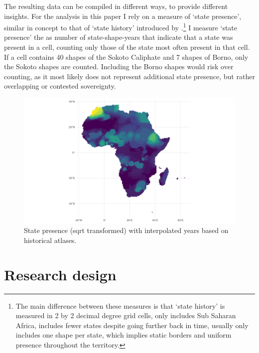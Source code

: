 \documentclass[12pt]{article}
\begin{document}
The resulting data can be compiled in different ways, to provide different
insights. For the analysis in this paper I rely on a measure of `state
presence', similar in concept to that of `state history' introduced by
\citet{Depetris-Chauvin2016}.\footnote{The main difference between these
	measures is that `state history' is measured in 2 by 2 decimal degree
	grid cells, only includes Sub Saharan Africa, includes fewer states
	despite going further back in time, usually only includes one shape per
state, which implies static borders and uniform presence throughout the
territory.} I measure `state presence' the as number of state-shape-years that
indicate that a state was present in a cell, counting only those of the state
most often present in that cell. If a cell contains 40 shapes of the Sokoto
Caliphate and 7 shapes of Borno, only the Sokoto shapes are counted. Including
the Borno shapes would risk over counting, as it most likely does not represent
additional state presence, but rather overlapping or contested sovereignty.


\begin{figure}[htpb]
	\centering
	\includegraphics[width=\linewidth]{../R/Output/sqrtSpAll.pdf}
	\caption{State presence (sqrt transformed) with interpolated years based
	on historical atlases.}
	\label{Sp_i}
\end{figure}


\section{Research design} \label{Research design}
\end{document}
